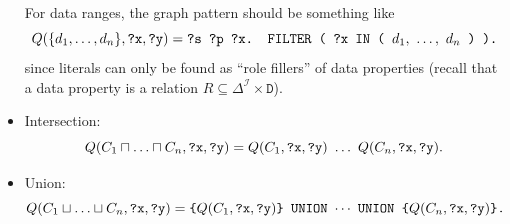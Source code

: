 \documentclass[a4paper]{article}
\begin{document}
\begin{itemize}
For data ranges, the graph pattern should be something like
\begin{equation}
  Q(\{d_1, \ldots, d_n\}, \mbox{\tt ?x}, \mbox{\tt ?y}) =
    \mbox{\tt ?s ?p ?x. FILTER ( ?x IN ( } d_1,\ \ldots,\ d_n \mbox{\tt\ ) ).}
\end{equation}
since literals can only be found as ``role fillers'' of data properties (recall
that a data property is a relation $R \subseteq \Delta^\mathcal{I} \times \mathtt{D}$).

\item Intersection:
\begin{equation}
  Q(C_1 \sqcap \ldots \sqcap C_n, \mbox{\tt ?x}, \mbox{\tt ?y}) =
    Q(C_1, \mbox{\tt ?x}, \mbox{\tt ?y})\ \ldots\ Q(C_n, \mbox{\tt ?x}, \mbox{\tt ?y}).
\end{equation}

\item Union:
\begin{equation}
  Q(C_1 \sqcup \ldots \sqcup C_n, \mbox{\tt ?x}, \mbox{\tt ?y}) =
    \mbox{\tt\{} Q(C_1, \mbox{\tt ?x}, \mbox{\tt ?y})\mbox{\tt \} }  \mathtt{UNION}\ \cdots\
    \mathtt{UNION}\mbox{\tt\ \{}  Q(C_n, \mbox{\tt ?x}, \mbox{\tt ?y}) \mbox{\tt\}.}
\end{equation}


\end{itemize}
\end{document}
